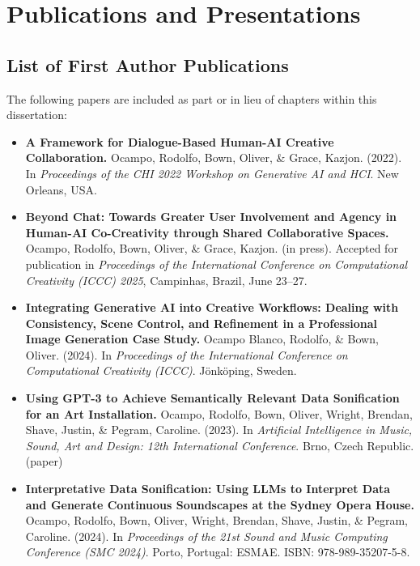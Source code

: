 \chapter{Publications and Presentations}

\section*{List of First Author Publications}

The following papers are included as part or in lieu of chapters within this dissertation:

\begin{itemize}

\item \textbf{A Framework for Dialogue-Based Human-AI Creative Collaboration.} Ocampo, Rodolfo, Bown, Oliver, \& Grace, Kazjon. (2022). In \textit{Proceedings of the CHI 2022 Workshop on Generative AI and HCI}. New Orleans, USA. 

\item \textbf{Beyond Chat: Towards Greater User Involvement and Agency in Human-AI Co-Creativity through Shared Collaborative Spaces.} Ocampo, Rodolfo, Bown, Oliver, \& Grace, Kazjon. (in press). Accepted for publication in \textit{Proceedings of the International Conference on Computational Creativity (ICCC) 2025}, Campinhas, Brazil, June 23–27.

\item \textbf{Integrating Generative AI into Creative Workflows: Dealing with Consistency, Scene Control, and Refinement in a Professional Image Generation Case Study.} Ocampo Blanco, Rodolfo, \& Bown, Oliver. (2024). In \textit{Proceedings of the International Conference on Computational Creativity (ICCC)}. Jönköping, Sweden. 

\item \textbf{Using GPT-3 to Achieve Semantically Relevant Data Sonification for an Art Installation.} Ocampo, Rodolfo, Bown, Oliver, Wright, Brendan, Shave, Justin, \& Pegram, Caroline. (2023). In \textit{Artificial Intelligence in Music, Sound, Art and Design: 12th International Conference}. Brno, Czech Republic. (paper)

\item \textbf{Interpretative Data Sonification: Using LLMs to Interpret Data and Generate Continuous Soundscapes at the Sydney Opera House.} Ocampo, Rodolfo, Bown, Oliver, Wright, Brendan, Shave, Justin, \& Pegram, Caroline. (2024). In \textit{Proceedings of the 21st Sound and Music Computing Conference (SMC 2024)}. Porto, Portugal: ESMAE. ISBN: 978-989-35207-5-8.


\end{itemize}



